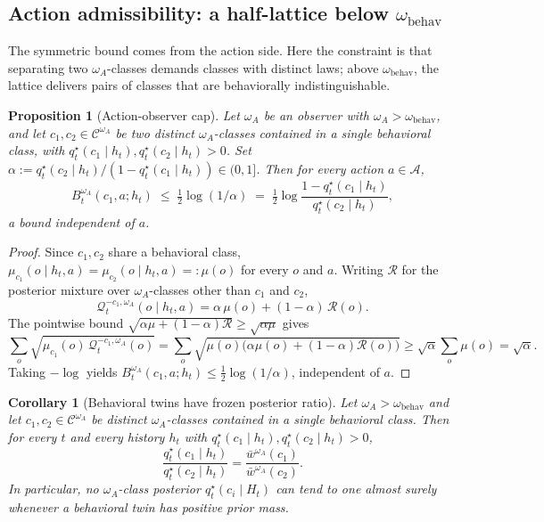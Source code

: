 \documentclass[11pt]{article}
\newtheorem{proposition}[theorem]{Proposition}
\newtheorem{corollary}[theorem]{Corollary}
\theoremstyle{definition}
\theoremstyle{remark}
\newcommand{\Acal}{\mathcal{A}}
\newcommand{\Ccal}{\mathcal{C}}
\newcommand{\Qcal}{\mathcal{Q}}
\newcommand{\Rcal}{\mathcal{R}}
\begin{document}
\subsection{Action admissibility: a half-lattice below $\omega_{\mathrm{behav}}$}
\label{sec:action-admissibility}

The symmetric bound comes from the action side. Here the constraint is that separating two $\omega_A$-classes demands classes with distinct laws; above $\omega_{\mathrm{behav}}$, the lattice delivers pairs of classes that are behaviorally indistinguishable.

\begin{proposition}[Action-observer cap]
\label{prop:action-cap}
Let $\omega_A$ be an observer with $\omega_A>\omega_{\mathrm{behav}}$, and let $c_1,c_2\in\Ccal^{\omega_A}$ be two distinct $\omega_A$-classes contained in a single behavioral class, with $q_t^\star(c_1\mid h_t),q_t^\star(c_2\mid h_t)>0$. Set $\alpha:=q_t^\star(c_2\mid h_t)/(1-q_t^\star(c_1\mid h_t))\in(0,1]$. Then for every action $a\in\Acal$,
\[
B_t^{\omega_A}(c_1,a;h_t)\;\le\;\tfrac{1}{2}\log(1/\alpha)
\;=\;\tfrac{1}{2}\log\!\frac{1-q_t^\star(c_1\mid h_t)}{q_t^\star(c_2\mid h_t)},
\]
a bound independent of $a$.
\end{proposition}

\begin{proof}
Since $c_1,c_2$ share a behavioral class, $\mu_{c_1}(o\mid h_t,a)=\mu_{c_2}(o\mid h_t,a)=:\mu(o)$ for every $o$ and $a$. Writing $\Rcal$ for the posterior mixture over $\omega_A$-classes other than $c_1$ and $c_2$,
\[
\Qcal_t^{-c_1,\omega_A}(o\mid h_t,a)=\alpha\,\mu(o)+(1-\alpha)\,\Rcal(o).
\]
The pointwise bound $\sqrt{\alpha\mu+(1-\alpha)\Rcal}\ge\sqrt{\alpha\mu}$ gives
\[
\sum_o\sqrt{\mu_{c_1}(o)\,\Qcal_t^{-c_1,\omega_A}(o)}=\sum_o\sqrt{\mu(o)\bigl(\alpha\mu(o)+(1-\alpha)\Rcal(o)\bigr)}\ge\sqrt{\alpha}\sum_o\mu(o)=\sqrt{\alpha}.
\]
Taking $-\log$ yields $B_t^{\omega_A}(c_1,a;h_t)\le\tfrac{1}{2}\log(1/\alpha)$, independent of $a$.
\end{proof}

\begin{corollary}[Behavioral twins have frozen posterior ratio]
\label{cor:twins-frozen-ratio}
Let $\omega_A>\omega_{\mathrm{behav}}$ and let $c_1,c_2\in\Ccal^{\omega_A}$ be distinct $\omega_A$-classes contained in a single behavioral class. Then for every $t$ and every history $h_t$ with $q_t^\star(c_1\mid h_t),q_t^\star(c_2\mid h_t)>0$,
\[
\frac{q_t^\star(c_1\mid h_t)}{q_t^\star(c_2\mid h_t)}=\frac{\bar w^{\omega_A}(c_1)}{\bar w^{\omega_A}(c_2)}.
\]
In particular, no $\omega_A$-class posterior $q_t^\star(c_i\mid H_t)$ can tend to one almost surely whenever a behavioral twin has positive prior mass.
\end{corollary}
\end{document}
